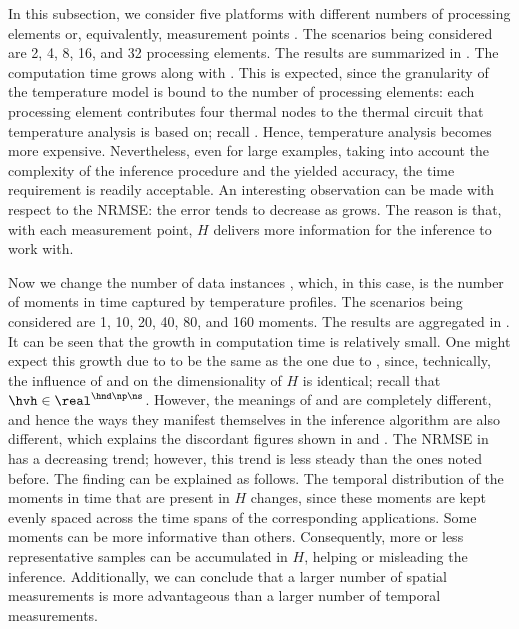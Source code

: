 
In this subsection, we consider five platforms with different numbers of
processing elements or, equivalently, measurement points \np. The scenarios
being considered are 2, 4, 8, 16, and 32 processing elements. The results are
summarized in . The computation time grows along with \np.
This is expected, since the granularity of the temperature model is bound to the
number of processing elements: each processing element contributes four thermal
nodes to the thermal  circuit that temperature analysis is based on;
recall . Hence, temperature analysis becomes more
expensive. Nevertheless, even for large examples, taking into account the
complexity of the inference procedure and the yielded accuracy, the time
requirement is readily acceptable. An interesting observation can be made with
respect to the \ac{NRMSE}: the error tends to decrease as \np grows. The reason
is that, with each measurement point, $H$ delivers more information for the
inference to work with.


Now we change the number of data instances \ns, which, in this case, is the
number of moments in time captured by temperature profiles. The scenarios being
considered are 1, 10, 20, 40, 80, and 160 moments. The results are aggregated in
. It can be seen that the growth in computation time is
relatively small. One might expect this growth due to \ns to be the same as the
one due to \np, since, technically, the influence of \np and \ns on the
dimensionality of $H$ is identical; recall that $\hvh \in \real^{\hnd \np \ns}$.
However, the meanings of \np and \ns are completely different, and hence the
ways they manifest themselves in the inference algorithm are also different,
which explains the discordant figures shown in  and
. The \ac{NRMSE} in  has a
decreasing trend; however, this trend is less steady than the ones noted before.
The finding can be explained as follows. The temporal distribution of the
moments in time that are present in $H$ changes, since these moments are kept
evenly spaced across the time spans of the corresponding applications. Some
moments can be more informative than others. Consequently, more or less
representative samples can be accumulated in $H$, helping or misleading the
inference. Additionally, we can conclude that a larger number of spatial
measurements is more advantageous than a larger number of temporal measurements.

